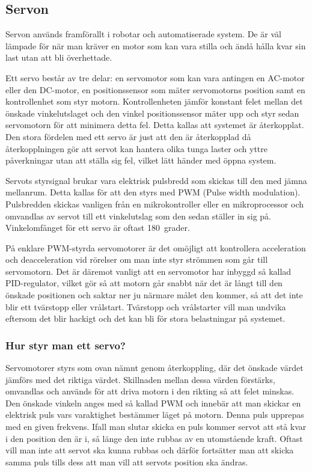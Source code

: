 \documentclass[a4paper,12pt]{article}
\begin{document}
\subsection{Servon}
Servon används framförallt i robotar och automatiserade system. De är väl lämpade för när man kräver en motor som kan vara stilla och ändå hålla kvar sin last utan att bli överhettade. 

Ett servo består av tre delar: en servomotor som kan vara antingen en AC-motor eller den DC-motor, en positionssensor som mäter servomotorns position samt en kontrollenhet som styr motorn. Kontrollenheten jämför konstant felet mellan det önskade vinkelutslaget och den vinkel positionssensor mäter upp och styr sedan servomotorn för att minimera detta fel. Detta kallas att systemet är återkopplat. Den stora fördelen med ett servo är just att den är återkopplad då återkopplningen gör att servot kan hantera olika tunga laster och yttre påverkningar utan att ställa sig fel, vilket lätt händer med öppna system. 

Servots styrsignal brukar vara elektrisk pulsbredd som skickas till den med jämna mellanrum. Detta kallas för att den styrs med PWM (Pulse width modulation). Pulsbredden skickas vanligen från en mikrokontroller eller en mikroprocessor och omvandlas av servot till ett vinkelutslag som den sedan ställer in sig på. Vinkelomfånget för ett servo är oftast 180~grader. 

På enklare PWM-styrda servomotorer är det omöjligt att kontrollera acceleration och deacceleration vid rörelser om man inte styr strömmen som går till servomotorn. Det är däremot vanligt att en servomotor har inbyggd så kallad PID-regulator, vilket gör så att motorn går snabbt när det är långt till den önskade positionen och saktar ner ju närmare målet den kommer, så att det inte blir ett tvärstopp eller vrålstart. Tvärstopp och vrålstarter vill man undvika eftersom det blir hackigt och det kan bli för stora belastningar på systemet.



\subsubsection{Hur styr man ett servo?}

Servomotorer styrs som ovan nämnt genom återkoppling, där det önskade värdet jämförs med det riktiga värdet. Skillnaden mellan dessa värden förstärks, omvandlas och används för att driva motorn i den rikting så att felet minskas. Den önskade vinkeln anges med så kallad PWM och innebär att man skickar en elektrisk puls vars varaktighet bestämmer läget på motorn. Denna puls upprepas med en given frekvens. Ifall man slutar skicka en puls kommer servot att stå kvar i den position den är i, så länge den inte rubbas av en utomstående kraft. Oftast vill man inte att servot ska kunna rubbas och därför fortsätter man att skicka samma puls tills dess att man vill att servots position ska ändras. 
\end{document}
